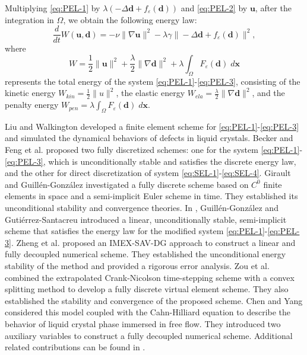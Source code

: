 \documentclass[12pt,reqno]{amsart}
\numberwithin{equation}{section}
\newcommand{\uu}{\mathrm{\textbf{u}}}
\newcommand{\dd}{\mathrm{\textbf{d}}}
\newcommand{\bx}{\mathrm{\textbf{x}}}
\begin{document}
Multiplying \eqref{eq:PEL-1} by $\lambda\left(-\Delta\dd+f_\varepsilon(\dd)\right)$ and \eqref{eq:PEL-2} by $\uu$, after the integration in $\Omega$, we obtain the following energy law:
\begin{equation}\label{edl4mEL}
\frac{d}{dt}W(\uu,\dd)
=-\nu\lVert \nabla \uu\rVert^2-\lambda\gamma\|-\Delta\dd+f_\varepsilon(\dd)\|^2,
\end{equation}
where 
$$W=\frac{1}{2}\lVert \uu\rVert^2
+\frac{\lambda}{2}\lVert\nabla\dd\rVert^2+\lambda\int_\Omega F_\varepsilon(\dd)\;d\bx$$
represents the total energy of the system \eqref{eq:PEL-1}-\eqref{eq:PEL-3}, consisting of the kinetic energy $W_{kin}=\frac{1}{2}\lVert u\rVert^2$, the elastic energy $W_{ela}=\frac{\lambda}{2}\lVert\nabla\dd\rVert^2$, and the penalty energy $W_{pen}=\lambda\int_\Omega F_\varepsilon(\dd)\;d\bx$. 

Liu and Walkington \cite{21Liu} developed a finite element scheme for \eqref{eq:PEL-1}-\eqref{eq:PEL-3} and simulated the dynamical behaviors of defects in liquid crystals. 
Becker and Feng et al.\cite{24Becker} proposed two fully discretized schemes: one for the system \eqref{eq:PEL-1}-\eqref{eq:PEL-3}, which is unconditionally stable and satisfies the discrete energy law, and the other for direct discretization of system \eqref{eq:SEL-1}-\eqref{eq:SEL-4}. 
Girault and Guill\'en-Gonz\'alez \cite{14Girault} investigated a fully discrete scheme based on $C^0$ finite elements in space and a semi-implicit Euler scheme in time. They established its unconditional stability and convergence theories.
In \cite{25Guillen}, Guill\'en-Gonz\'alez and Guti\'errez-Santacreu introduced a linear, unconditionally stable, semi-implicit scheme that satisfies the energy law for the modified system \eqref{eq:PEL-1}-\eqref{eq:PEL-3}.
Zheng et al. \cite{23zheng} proposed an IMEX-SAV-DG approach to construct a linear and fully decoupled numerical scheme. They established the unconditional energy stability of the method and provided a rigorous error analysis.
Zou et al. \cite{23zou} combined the extrapolated Crank-Nicolson time-stepping scheme with a convex splitting method to develop a fully discrete virtual element scheme. They also established the stability and convergence of the proposed scheme.
Chen and Yang \cite{23chen} considered this model coupled with the Cahn-Hilliard equation to describe the behavior of liquid crystal phase immersed in free flow.
They introduced two auxiliary variables to construct a fully decoupled numerical scheme.
Additional related contributions can be found in \cite{22chen,26Liu,27Zhao,21wang,23zhang,28Zhao,29Zhao}.
\end{document}
